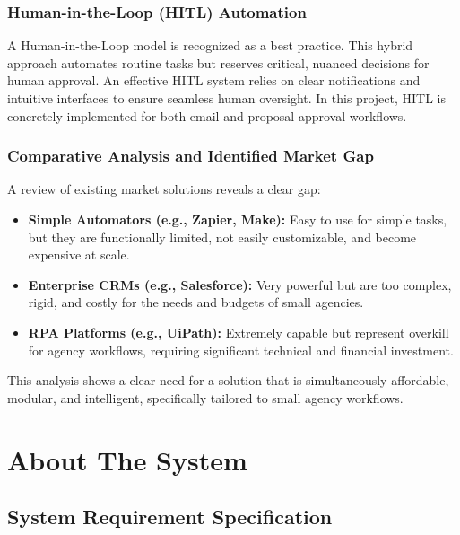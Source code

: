 \documentclass[12pt,a4paper]{report}
\begin{document}
\subsection{Human-in-the-Loop (HITL) Automation}
A Human-in-the-Loop model is recognized as a best practice. This hybrid approach automates routine tasks but reserves critical, nuanced decisions for human approval. An effective HITL system relies on clear notifications and intuitive interfaces to ensure seamless human oversight. In this project, HITL is concretely implemented for both email and proposal approval workflows.

\subsection{Comparative Analysis and Identified Market Gap}
A review of existing market solutions reveals a clear gap:

\begin{itemize}
    \item \textbf{Simple Automators (e.g., Zapier, Make):} Easy to use for simple tasks, but they are functionally limited, not easily customizable, and become expensive at scale.
    \item \textbf{Enterprise CRMs (e.g., Salesforce):} Very powerful but are too complex, rigid, and costly for the needs and budgets of small agencies.
    \item \textbf{RPA Platforms (e.g., UiPath):} Extremely capable but represent overkill for agency workflows, requiring significant technical and financial investment.
\end{itemize}

This analysis shows a clear need for a solution that is simultaneously affordable, modular, and intelligent, specifically tailored to small agency workflows.

\chapter{About The System}

\section{System Requirement Specification}
\end{document}
